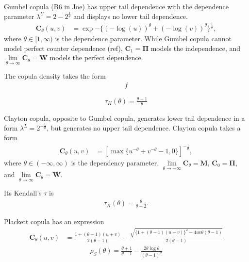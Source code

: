 \documentclass[square]{article} %
\begin{document}
    Gumbel copula (B6 in Joe) has upper tail dependence with the dependence parameter
    $\lambda^U = 2-2^{\frac{1}{\theta}}$ and displays no lower tail dependence.
    \begin{align}
        \bm{C}_{\theta}(u,v) &= \exp{-\{
        (-\log(u))^\theta +(-\log(v))^\theta
        \}^{\frac{1}{\theta}}},
        \end{align}
    where $\theta \in [1,\infty)$ is the dependence parameter.
    While Gumbel copula cannot model perfect counter dependence (ref), $\bm{C}_{1} = \bm{\Pi}$ models the independence,
    and $\lim\limits_{\theta \to \infty} \bm{C}_\theta = \bm{W}$ models the perfect dependence.

    The copula density takes the form
    \begin{align}
            f
        \end{align}

      \begin{align}
        \tau_K(\theta) =\frac{\theta-1}{\theta}
        \end{align}

    Clayton copula, opposite to Gumbel copula,
    generates lower tail dependence in a form $\lambda^L = 2^{-\frac{1}{\theta}}$,
    but generates no upper tail dependence.
    Clayton copula takes a form
    \begin{align}
        \bm{C}_{\theta}(u,v) &= \left[
        \max\{u^{-\theta}+v^{-\theta}-1,0\}\right]^{-\frac{1}{\theta}},
        \end{align}
    where $\theta \in (-\infty, \infty)$ is the dependency parameter.
    $\lim\limits_{\theta \to -\infty} \bm{C}_\theta = \bm{M}$, $\bm{C}_0 = \bm{\Pi}$, and $\lim\limits_{\theta \to \infty} \bm{C}_\theta = \bm{W}$.

    Its Kendall's $\tau$ is
    \begin{align}
        \tau_K(\theta) =\frac{\theta}{\theta+2}.
        \end{align}

    Plackett copula has an expression
    \begin{align}
        \bm{C}_{\theta}(u,v) &= \frac{1+(\theta-1)(u+v)}{2(\theta-1)}
                             - \frac{\sqrt{\{
        1+(\theta-1)(u+v)\}^2 - 4uv\theta(\theta-1)}}{2(\theta-1)}
        \end{align}
    \begin{align}
        \rho_S(\theta) = \frac{\theta+1}{\theta-1} - \frac{2\theta \log \theta}{(\theta-1)^2}
        \end{align}
\end{document}
